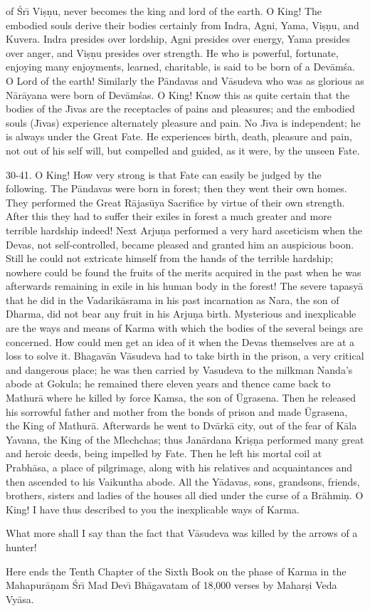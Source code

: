 of \'Sr\={\i} Vi\d{s}\d{n}u, never becomes the king and lord of the earth. O King! The embodied souls derive their bodies certainly from Indra, Agni, Yama, Vi\d{s}\d{n}u, and Kuvera. Indra presides over lordship, Agni presides over energy, Yama presides over anger, and Vi\d{s}\d{n}u presides over strength. He who is powerful, fortunate, enjoying many enjoyments, learned, charitable, is said to be born of a Dev\=am\'sa. O Lord of the earth! Similarly the P\=andavas and V\=asudeva who was as glorious as N\=ar\=ayana were born of Dev\=am\'sas. O King! Know this as quite certain that the bodies of the J\={\i}vas are the receptacles of pains and pleasures; and the embodied souls (J\={\i}vas) experience alternately pleasure and pain. No J\={\i}va is independent; he is always under the Great Fate. He experiences birth, death, pleasure and pain, not out of his self will, but compelled and guided, as it were, by the unseen Fate.

30-41. O King! How very strong is that Fate can easily be judged by the following. The P\=andavas were born in forest; then they went their own homes. They performed the Great R\=ajas\=uya Sacrifice by virtue of their own strength. After this they had to suffer their exiles in forest a much greater and more terrible hardship indeed! Next Arju\d{n}a performed a very hard asceticism when the Devas, not self-controlled, became pleased and granted him an auspicious boon. Still he could not extricate himself from the hands of the terrible hardship; nowhere could be found the fruits of the merits acquired in the past when he was afterwards remaining in exile in his human body in the forest! The severe tapasy\=a that he did in the Vadarik\=asrama in his past incarnation as Nara, the son of Dharma, did not bear any fruit in his Arju\d{n}a birth. Mysterious and inexplicable are the ways and means of Karma with which the bodies of the several beings are concerned. How could men get an idea of it when the Devas themselves are at a loss to solve it. Bhagav\=an V\=asudeva had to take birth in the prison, a very critical and dangerous place; he was then carried by Vasudeva to the milkman Nanda's abode at Gokula; he remained there eleven years and thence came back to Mathur\=a where he killed by force Kamsa, the son of \=Ugrasena. Then he released his sorrowful father and mother from the bonds of prison and made \=Ugrasena, the King of Mathur\=a. Afterwards he went to Dv\=ark\=a city, out of the fear of K\=ala Yavana, the King of the Mlechchas; thus Jan\=ardana Kri\d{s}\d{n}a performed many great and heroic deeds, being impelled by Fate. Then he left his mortal coil at Prabh\=asa, a place of pilgrimage, along with his relatives and acquaintances and then ascended to his Vaikuntha abode. All the Y\=adavas, sons, grandsons, friends, brothers, sisters and ladies of the houses all died under the curse of a Br\=ahmi\d{n}. O King! I have thus described to you the inexplicable ways of Karma.

What more shall I say than the fact that V\=asudeva was killed by the arrows of a hunter!

Here ends the Tenth Chapter of the Sixth Book on the phase of Karma in the Mahapur\=a\d{n}am \'Sr\={\i} Mad Dev\={\i} Bh\=agavatam of 18,000 verses by Mahar\d{s}i Veda Vy\=asa.



